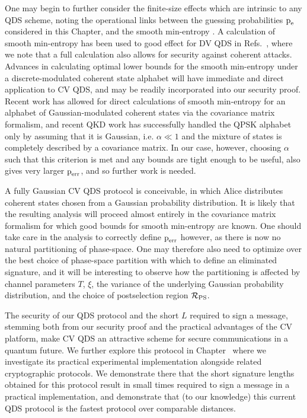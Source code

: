 One may begin to further consider the finite-size effects \cite{Tomamichel2016} which are intrinsic to any QDS scheme, noting the operational links between the guessing probabilities $\text{p}_{\text{e}}$ considered in this Chapter, and the smooth min-entropy \cite{Konig2009}. A calculation of smooth min-entropy has been used to good effect for DV QDS in Refs.~\cite{Amiri2016, Puthoor2016}, where we note that a full calculation also allows for security against coherent attacks. Advances in calculating optimal lower bounds for the smooth min-entropy under a discrete-modulated coherent state alphabet will have immediate and direct application to CV QDS, and may be readily incorporated into our security proof. Recent work \cite{Seshadreesan2017} has allowed for direct calculations of smooth min-entropy for an alphabet of Gaussian-modulated coherent states via the covariance matrix formalism, and recent QKD work \cite{Ghorai2019, Lin2019} has successfully handled the QPSK alphabet only by assuming that it is Gaussian, i.e. $\alpha \ll 1$ and the mixture of states is completely described by a covariance matrix. In our case, however, choosing $\alpha$ such that this criterion is met and any bounds are tight enough to be useful, also gives very larger $\text{p}_{\text{err}}$, and so further work is needed.

A fully Gaussian CV QDS protocol is conceivable, in which Alice distributes coherent states chosen from a Gaussian probability distribution. It is likely that the resulting analysis will proceed almost entirely in the covariance matrix formalism \cite{Weedbrook2012, Serafini2018} for which good bounds for smooth min-entropy are known. One should take care in the analysis to correctly define $\text{p}_{\text{err}}$ however, as there is now no natural partitioning of phase-space. One may therefore also need to optimize over the best choice of phase-space partition with which to define an eliminated signature, and it will be interesting to observe how the partitioning is affected by channel parameters $T$, $\xi$, the variance of the underlying Gaussian probability distribution, and the choice of postselection region $\mathcal{R}_{\text{PS}}$.


The security of our QDS protocol and the short $L$ required to sign a message, stemming both from our security proof and the practical advantages of the CV platform, make CV QDS an attractive scheme for secure communications in a quantum future. We further explore this protocol in Chapter~\cite{chapter:aqc} where we investigate its practical experimental implementation alongside related cryptographic protocols. We demonstrate there that the short signature lengths obtained for this protocol result in small times required to sign a message in a practical implementation, and demonstrate that (to our knowledge) this current QDS protocol is the fastest protocol over comparable distances.

